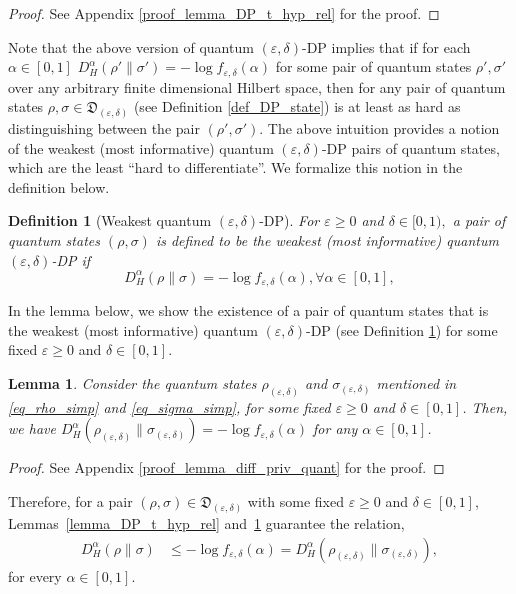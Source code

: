 \documentclass[onecolumn,ldraftcls, 11pt]{IEEEtran}
\newcommand{\eps}{\varepsilon}
\newtheorem{definition}{Definition}
\newtheorem{lemma}{Lemma}
\begin{document}
\begin{proof}
    See Appendix \ref{proof_lemma_DP_t_hyp_rel} for the proof.
\end{proof}



Note that the above version of quantum $(\eps,\delta)$-DP implies that if for each $\alpha \in [0,1]$ $D^{\alpha}_H(\rho'\|\sigma') =-\log f_{\eps,\delta}(\alpha)$ for some pair of quantum states $\rho',\sigma'$ over any arbitrary finite dimensional Hilbert space, then for any pair of quantum states $\rho,\sigma \in \mathfrak{D}_{(\eps,\delta)}$ (see Definition \ref{def_DP_state}) is at least as hard as distinguishing between the pair $(\rho',\sigma')$.
The above intuition provides a notion of the weakest (most informative) quantum $(\eps,\delta)$-DP pairs of quantum states, which are the least ``hard to differentiate''. We formalize this notion in the definition below.

\begin{definition}[Weakest quantum $(\eps,\delta)$-DP]\label{def_opt_DP_state}
     For $\eps \geq 0 $ and $\delta \in [0,1),$ a pair of quantum states $(\rho,\sigma)$ is defined to be the weakest (most informative) quantum $(\eps,\delta)$-DP if
\begin{equation}
    D^{\alpha}_{H} {(\rho\|\sigma)} = -\log f_{\eps,\delta}(\alpha), \forall \alpha \in [0,1], \label{def_opt_DP_state_eq}
\end{equation}
\end{definition}

In the lemma below, we show the existence of a pair of quantum states that is the weakest (most informative) quantum $(\eps,\delta)$-DP (see Definition \ref{def_opt_DP_state}) for some fixed $\eps \geq 0$ and $\delta \in [0,1]$.

\begin{lemma}\label{lemma_diff_priv_quant}
    Consider the quantum states $\rho_{(\eps,\delta)}$ and $\sigma_{(\eps,\delta)}$ mentioned in \eqref{eq_rho_simp} and \eqref{eq_sigma_simp}, for some fixed $\eps \geq 0$ and $\delta \in [0,1]$. 
    Then, we have $D^{\alpha}_{H}(\rho_{(\eps,\delta)}\|\sigma_{(\eps,\delta)}) = -\log f_{\eps,\delta}(\alpha)$ for any $\alpha \in [0,1]$.
\end{lemma}
\begin{proof}
    See Appendix \ref{proof_lemma_diff_priv_quant} for the proof.
\end{proof}

Therefore, for a pair $(\rho,\sigma) \in \mathfrak{D}_{(\varepsilon,\delta)}$ with some fixed $\varepsilon \geq 0$ and $\delta \in [0,1]$,
Lemmas~\ref{lemma_DP_t_hyp_rel} and~\ref{lemma_diff_priv_quant} guarantee the relation,
    \begin{align}
        D^{\alpha}_{H}(\rho\|\sigma) &\leq -\log f_{\eps,\delta}(\alpha)
        = D^{\alpha}_{H}(\rho_{(\eps,\delta)}\|\sigma_{(\eps,\delta)}),\label{theo_QLDP_approx_F_div_eq1}
    \end{align}
 for every $\alpha \in [0,1]$.
\end{document}
